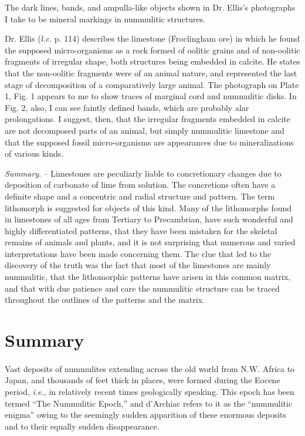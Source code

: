 \documentclass[a4paper, 12pt, oneside]{article}
\begin{document}
The dark lines, bands, and ampulla-like objects shown in Dr. Ellis's photographs I take to be mineral markings in nummulitic structures.

Dr. Ellis (\emph{l.c.} p. 114) describes the limestone (Froclingham ore) in which he found the supposed micro-organisms as a rock formed of oolitic grains and of non-oolitic fragments of irregular shape, both structures being embedded in calcite. He states that the non-oolitic fragments were of an animal nature, and represented the last stage of decomposition of a comparatively large animal. The photograph on Plate 1, Fig. 1 appears to me to show traces of marginal cord and nummulitic disks. In Fig. 2, also, I can see faintly defined bands, which are probably alar prolongations. I suggest, then, that the irregular fragments embedded in calcite are not decomposed parts of an animal, but simply nummulitic limestone and that the supposed fossil micro-organisms are appearances due to mineralizations of various kinds.

\emph{Summary}. -- Limestones are peculiarly liable to concretionary changes due to deposition of carbonate of lime from solution. The concretions often have a definite shape and a concentric and radial structure and pattern. The term lithomorph is suggested for objects of this kind. Many of the lithomorphs found in limestones of all ages from Tertiary to Precambrian, have such wonderful and highly differentiated patterns, that they have been mistaken for the skeletal remains of animals and plants, and it is not surprising that numerous and varied interpretations have been made concerning them. The clue that led to the discovery of the truth was the fact that most of the limestones are mainly nummulitic, that the lithomorphic patterns have arisen in this common matrix, and that with due patience and care the nummulitic structure can be traced throughout the outlines of the patterns and the matrix.
\clearpage
\section{Summary}
\paragraph{}
Vast deposits of nummulites extending across the old world from N.W. Africa to Japan, and thousands of feet thick in places, were formed during the Eocene period, \emph{i.e.}, in relatively recent times geologically speaking. This epoch has been termed ``The Nummulitic Epoch,'' and d'Archiac refers to it as the ``nummulitic enigma'' owing to the seemingly sudden apparition of these enormous deposits and to their equally sudden disappearance.
\end{document}

